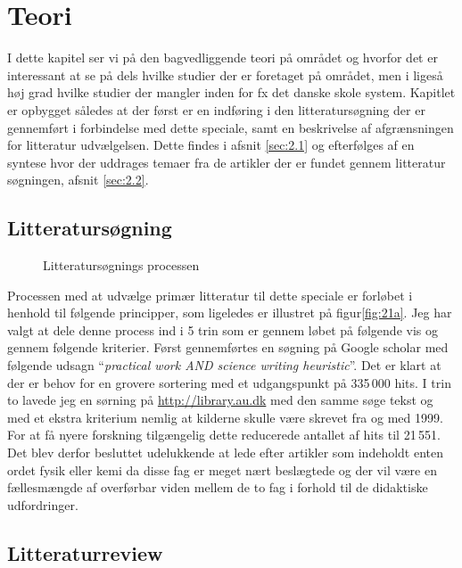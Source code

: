 \chapter{Teori}
\label{Ch:2}

I dette kapitel ser vi på den bagvedliggende teori på området og hvorfor det er interessant at se på dels hvilke studier der er foretaget på området, men i ligeså høj grad hvilke studier der mangler inden for fx det danske skole system. Kapitlet er opbygget således at der først er en indføring i den litteratursøgning der er gennemført i forbindelse med dette speciale, samt en beskrivelse af afgrænsningen for litteratur udvælgelsen. Dette findes i afsnit \vref{sec:2.1} og efterfølges af en syntese hvor der uddrages temaer fra de artikler der er fundet gennem litteratur søgningen, afsnit \vref{sec:2.2}.

\section{Litteratursøgning}
\label{sec:2.1}


\begin{wrapfigure}{o}{0.5\textwidth}
	\centering
	\caption{Litteratursøgnings processen}
	\label{fig:21a}
\end{wrapfigure}

Processen med at udvælge primær litteratur til dette speciale er forløbet i henhold til følgende principper, som ligeledes er illustret på  figur\vref{fig:21a}. Jeg har valgt at dele denne process ind i 5 trin som er gennem løbet på følgende vis og gennem følgende kriterier. Først gennemførtes en søgning på Google scholar med følgende udsagn ``\emph{practical work AND science writing heuristic}''. Det er klart at der er behov for en grovere sortering med et udgangspunkt på 335\,000 hits. 
I trin to lavede jeg en sørning på \url{http://library.au.dk} med den samme søge tekst og med et ekstra kriterium nemlig at kilderne skulle være skrevet fra og med 1999. For at få nyere forskning tilgængelig dette reducerede antallet af hits til 21\,551. Det blev derfor besluttet udelukkende at lede efter artikler som indeholdt enten ordet fysik eller kemi da disse fag er meget nært beslægtede og der vil være en fællesmængde af overførbar viden mellem de to fag i forhold til de didaktiske udfordringer.


\section{Litteraturreview}
\label{sec:2.2}

\lipsum*